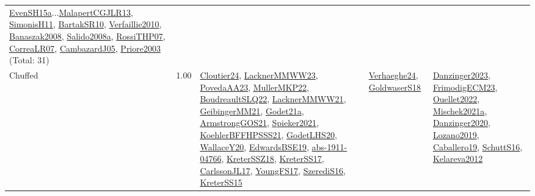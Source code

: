 {\begin{longtable}{p{3cm}r>{\raggedright\arraybackslash}p{6cm}>{\raggedright\arraybackslash}p{6cm}>{\raggedright\arraybackslash}p{8cm}}
\hyperref[detail:EvenSH15a]{EvenSH15a}...\hyperref[detail:MalapertCGJLR13]{MalapertCGJLR13}, \hyperref[detail:SimonisH11]{SimonisH11}, \hyperref[detail:BartakSR10]{BartakSR10}, \hyperref[detail:Verfaillie2010]{Verfaillie2010}, \hyperref[detail:Banaszak2008]{Banaszak2008}, \hyperref[detail:Salido2008a]{Salido2008a}, \hyperref[detail:RossiTHP07]{RossiTHP07}, \hyperref[detail:CorreaLR07]{CorreaLR07}, \hyperref[detail:CambazardJ05]{CambazardJ05}, \hyperref[detail:Priore2003]{Priore2003} (Total: 31)\\
\index{Chuffed}\index{CPSystems!Chuffed}Chuffed &  1.00 & \hyperref[detail:Cloutier24]{Cloutier24}, \hyperref[detail:LacknerMMWW23]{LacknerMMWW23}, \hyperref[detail:PovedaAA23]{PovedaAA23}, \hyperref[detail:MullerMKP22]{MullerMKP22}, \hyperref[detail:BoudreaultSLQ22]{BoudreaultSLQ22}, \hyperref[detail:LacknerMMWW21]{LacknerMMWW21}, \hyperref[detail:GeibingerMM21]{GeibingerMM21}, \hyperref[detail:Godet21a]{Godet21a}, \hyperref[detail:ArmstrongGOS21]{ArmstrongGOS21}, \hyperref[detail:Spieker2021]{Spieker2021}, \hyperref[detail:KoehlerBFFHPSSS21]{KoehlerBFFHPSSS21}, \hyperref[detail:GodetLHS20]{GodetLHS20}, \hyperref[detail:WallaceY20]{WallaceY20}, \hyperref[detail:EdwardsBSE19]{EdwardsBSE19}, \hyperref[detail:abs-1911-04766]{abs-1911-04766}, \hyperref[detail:KreterSSZ18]{KreterSSZ18}, \hyperref[detail:KreterSS17]{KreterSS17}, \hyperref[detail:CarlssonJL17]{CarlssonJL17}, \hyperref[detail:YoungFS17]{YoungFS17}, \hyperref[detail:SzerediS16]{SzerediS16}, \hyperref[detail:KreterSS15]{KreterSS15} & \hyperref[detail:Verhaeghe24]{Verhaeghe24}, \hyperref[detail:GoldwaserS18]{GoldwaserS18} & \hyperref[detail:Danzinger2023]{Danzinger2023}, \hyperref[detail:FrimodigECM23]{FrimodigECM23}, \hyperref[detail:Ouellet2022]{Ouellet2022}, \hyperref[detail:Mischek2021a]{Mischek2021a}, \hyperref[detail:Danzinger2020]{Danzinger2020}, \hyperref[detail:Lozano2019]{Lozano2019}, \hyperref[detail:Caballero19]{Caballero19}, \hyperref[detail:SchuttS16]{SchuttS16}, \hyperref[detail:Kelareva2012]{Kelareva2012}\\

\end{longtable}}
